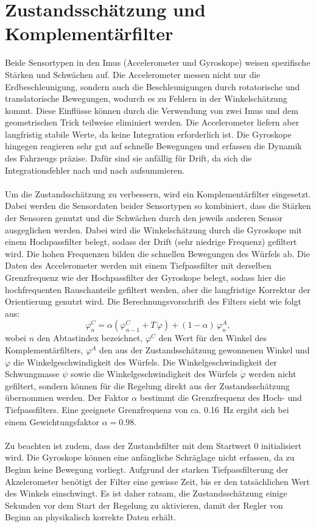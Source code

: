     \section{Zustandsschätzung und Komplementärfilter}
    \label{sec:complementary}
        Beide Sensortypen in den Imus (Accelerometer und Gyroskope) weisen spezifische Stärken und Schwächen auf. Die Accelerometer messen nicht nur die Erdbeschleunigung, sondern auch die Beschleunigungen durch rotatorische und translatorische Bewegungen, wodurch es zu Fehlern in der Winkelschätzung kommt. Diese Einflüsse können durch die Verwendung von zwei Imus und dem geometrischen Trick teilweise eliminiert werden. Die Accelerometer liefern aber langfristig stabile Werte, da keine Integration erforderlich ist. Die Gyroskope hingegen reagieren sehr gut auf schnelle Bewegungen und erfassen die Dynamik des Fahrzeugs präzise. Dafür sind sie anfällig für Drift, da sich die Integrationsfehler nach und nach aufsummieren.\\
        \\
        Um die Zustandsschätzung zu verbessern, wird ein Komplementärfilter eingesetzt. Dabei werden die Sensordaten beider Sensortypen so kombiniert, dass die Stärken der Sensoren genutzt und die Schwächen durch den jeweils anderen Sensor ausgeglichen werden. Dabei wird die Winkelschätzung durch die Gyroskope mit einem Hochpassfilter belegt, sodass der Drift (sehr niedrige Frequenz) gefiltert wird. Die hohen Frequenzen bilden die schnellen Bewegungen des Würfels ab. Die Daten des Accelerometer werden mit einem Tiefpassfilter mit derselben Grenzfrequenz wie der Hochpassfilter der Gyroskope belegt, sodass hier die hochfrequenten Rauschanteile gefiltert werden, aber die langfristige Korrektur der Orientierung genutzt wird. Die Berechnungsvorschrift des Filters sieht wie folgt aus:
        \[
            \varphi_n^{C}
            =
            \alpha \left( \varphi_{n-1}^{C} + T \, \dot{\varphi} \right)
            +
            (1 - \alpha)\,\varphi_n^{A},
        \]
        wobei $n$ den Abtastindex bezeichnet, $\varphi^{C}$ den Wert für den Winkel des Komplementärfilters, $\varphi^{A}$ den aus der Zustandsschätzung gewonnenen Winkel und $\dot{\varphi}$ die Winkelgeschwindigkeit des Würfels. Die Winkelgeschwindigkeit der Schwungmasse $\dot{\psi}$ sowie die Winkelgeschwindigkeit des Würfels $\dot{\varphi}$ werden nicht gefiltert, sondern können für die Regelung direkt aus der Zustandsschätzung übernommen werden. Der Faktor $\alpha$ bestimmt die Grenzfrequenz des Hoch- und Tiefpassfilters. Eine geeignete Grenzfrequenz von ca. \SI{0.16}{\hertz} ergibt sich bei einem Gewichtungsfaktor $\alpha = \num{0.98}$.\\
        \\
        Zu beachten ist zudem, dass der Zustandsfilter mit dem Startwert 0 initialisiert wird. Die Gyroskope können eine anfängliche Schräglage nicht erfassen, da zu Beginn keine Bewegung vorliegt. Aufgrund der starken Tiefpassfilterung der Akzelerometer benötigt der Filter eine gewisse Zeit, bis er den tatsächlichen Wert des Winkels einschwingt. Es ist daher ratsam, die Zustandsschätzung einige Sekunden vor dem Start der Regelung zu aktivieren, damit der Regler von Beginn an physikalisch korrekte Daten erhält.
